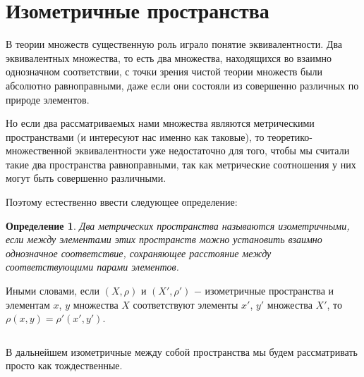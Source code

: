 \documentclass{article}
\newtheorem{definition}{Определение}[section]
\begin{document}
\section{Изометричные пространства}

В теории множеств существенную роль играло понятие эквивалентности. Два эквивалентных множества, то есть два множества, находящихся во взаимно однозначном соответствии, с точки зрения чистой теории множеств были абсолютно равноправными, даже если они состояли из совершенно различных по природе элементов.

Но если два рассматриваемых нами множества являются метрическими пространствами (и интересуют нас именно как таковые), то теоретико-множественной эквивалентности уже недостаточно для того, чтобы мы считали такие два пространства равноправными, так как метрические соотношения у них могут быть совершенно различными.

Поэтому естественно ввести следующее определение:

\begin{definition}
Два метрических пространства называются изометричными, если между элементами этих пространств можно установить взаимно однозначное соответствие, сохраняющее расстояние между соответствующими парами элементов.
\end{definition}

Иными словами, если \((X, \rho)\) и \((X', \rho')\) \(-\) изометричные пространства и элементам \(x\), \(y\) множества \(X\) соответствуют элементы \(x'\), \(y'\) множества \(X'\), то \(\rho(x, y) = \rho'(x', y')\).

\(\)

В дальнейшем изометричные между собой пространства мы будем рассматривать просто как тождественные.
\end{document}
